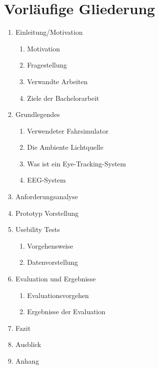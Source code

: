 \documentclass[a4paper, 11pt]{article}
\begin{document}
\section {Vorl\"{a}ufige Gliederung}
\begin{enumerate}
\item{Einleitung/Motivation}
	\begin{enumerate}
	\item{Motivation}
	\item{Fragestellung}
	\item{Verwandte Arbeiten}
	\item{Ziele der Bachelorarbeit}
	\end{enumerate}
\item{Grundlegendes}
	\begin{enumerate}
	\item{Verwendeter Fahrsimulator}
	\item{Die Ambiente Lichtquelle}
	\item{Was ist ein Eye-Tracking-System}
	\item{EEG-System}
	\end{enumerate}
\item{Anforderungsanalyse}
\item{Prototyp Vorstellung}
\item{Usebility Tests}
	\begin{enumerate}
	\item{Vorgehensweise}
	\item{Datenvorstellung}
	\end{enumerate}
\item{Evaluation und Ergebnisse}
	\begin{enumerate}
	\item{Evaluationsvorgehen}
	\item{Ergebnisse der Evaluation}
	\end{enumerate}
\item{Fazit}
\item{Ausblick}
\item{Anhang}
\end{enumerate}

\end{document}
